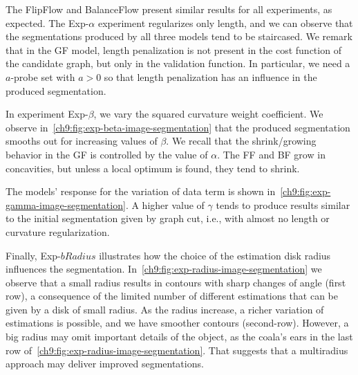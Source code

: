 The FlipFlow and BalanceFlow present similar results for all experiments, as expected. The Exp-$\alpha$ experiment regularizes only length, and we can observe that the segmentations produced by all three models tend to be staircased. We remark that in the GF model, length penalization is not present in the cost function of the candidate graph, but only in the validation function. In particular, we need  a $a$-probe set with $a>0$ so that length penalization has an influence in the produced segmentation.

In experiment Exp-$\beta$, we vary the squared curvature weight coefficient. We observe in~\cref{ch9:fig:exp-beta-image-segmentation} that the produced segmentation smooths out for increasing values of $\beta$. We recall that the shrink/growing behavior in the GF is controlled by the value of $\alpha$. The FF and BF grow in concavities, but unless a local optimum is found, they tend to shrink.

The models' response for the variation of data term is shown in~\cref{ch9:fig:exp-gamma-image-segmentation}. A higher value of $\gamma$ tends to produce results similar to the initial segmentation given by graph cut, i.e., with almost no length or curvature regularization.

Finally, Exp-$bRadius$ illustrates how the choice of the estimation disk radius influences the segmentation. In~\cref{ch9:fig:exp-radius-image-segmentation} we observe that a small radius results in contours with sharp changes of angle (first row), a consequence of the limited number of different estimations that can be given by a disk of small radius. As the radius increase, a richer variation of estimations is possible, and we have smoother contours (second-row). However, a big radius may omit important details of the object, as the coala's ears in the last row of~\cref{ch9:fig:exp-radius-image-segmentation}. That suggests that a multiradius approach may deliver improved segmentations.


